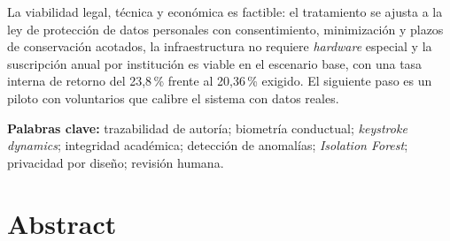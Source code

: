 La viabilidad legal, técnica y económica es factible: el tratamiento se ajusta a la ley de protección de datos personales con consentimiento, minimización y plazos de conservación acotados, la infraestructura no requiere \textit{hardware} especial y la suscripción anual por institución es viable en el escenario base, con una tasa interna de retorno del 23,8\,\% frente al 20,36\,\% exigido. El siguiente paso es un piloto con voluntarios que calibre el sistema con datos reales.

\vspace{4pt}
\noindent\textbf{Palabras clave:} trazabilidad de autoría; biometría conductual; \textit{keystroke dynamics}; integridad académica; detección de anomalías; \textit{Isolation Forest}; privacidad por diseño; revisión humana.

\newpage
\chapter*{Abstract}
